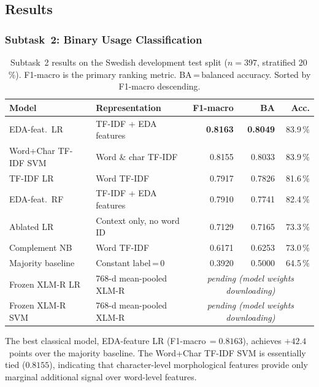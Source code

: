 \subsection{Results}

\subsubsection{Subtask~2: Binary Usage Classification}

\begin{table}[H]
\centering
\caption{Subtask~2 results on the Swedish development test split ($n=397$,
  stratified 20\,\%).  F1-macro is the primary ranking metric.
  BA\,=\,balanced accuracy.  Sorted by F1-macro descending.}
\label{tab:subtask2}
\small
\begin{tabular}{llrrr}
\toprule
\textbf{Model} & \textbf{Representation} & \textbf{F1-macro} & \textbf{BA} & \textbf{Acc.} \\
\midrule
EDA-feat.\ LR        & TF-IDF + EDA features    & \textbf{0.8163} & \textbf{0.8049} & 83.9\,\% \\
Word+Char TF-IDF SVM & Word \& char TF-IDF      & 0.8155          & 0.8033          & 83.9\,\% \\
TF-IDF LR            & Word TF-IDF              & 0.7917          & 0.7826          & 81.6\,\% \\
EDA-feat.\ RF        & TF-IDF + EDA features    & 0.7910          & 0.7741          & 82.4\,\% \\
Ablated LR           & Context only, no word ID & 0.7129          & 0.7165          & 73.3\,\% \\
Complement NB        & Word TF-IDF              & 0.6171          & 0.6253          & 73.0\,\% \\
Majority baseline    & Constant label\,=\,0     & 0.3920          & 0.5000          & 64.5\,\% \\
\midrule
Frozen XLM-R LR      & 768-d mean-pooled XLM-R  & \multicolumn{3}{c}{\emph{pending (model weights downloading)}} \\
Frozen XLM-R SVM     & 768-d mean-pooled XLM-R  & \multicolumn{3}{c}{\emph{pending (model weights downloading)}} \\
\bottomrule
\end{tabular}
\end{table}

The best classical model, EDA-feature LR (F1-macro\,$=0.8163$), achieves
$+42.4$~points over the majority baseline.  The Word+Char TF-IDF SVM is
essentially tied ($0.8155$), indicating that character-level morphological
features provide only marginal additional signal over word-level features.

